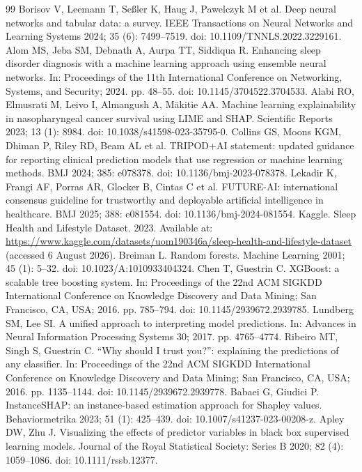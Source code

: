 \documentclass[a4paper,fleqn]{cas-dc}
\begin{document}
\begin{thebibliography}{99}
 Borisov V, Leemann T, Se{\ss}ler K, Haug J, Pawelczyk M et al. Deep neural networks and tabular data: a survey. IEEE Transactions on Neural Networks and Learning Systems 2024; 35 (6): 7499--7519. doi: 10.1109/\allowbreak TNNLS.2022.3229161.
 Alom MS, Jeba SM, Debnath A, Aurpa TT, Siddiqua R. Enhancing sleep disorder diagnosis with a machine learning approach using ensemble neural networks. In: Proceedings of the 11th International Conference on Networking, Systems, and Security; 2024. pp. 48--55. doi: 10.1145/3704522.3704533.
 Alabi RO, Elmusrati M, Leivo I, Almangush A, M{\"a}kitie AA. Machine learning explainability in nasopharyngeal cancer survival using LIME and SHAP. Scientific Reports 2023; 13 (1): 8984. doi: 10.1038/s41598-023-35795-0.
 Collins GS, Moons KGM, Dhiman P, Riley RD, Beam AL et al. TRIPOD+AI statement: updated guidance for reporting clinical prediction models that use regression or machine learning methods. BMJ 2024; 385: e078378. doi: 10.1136/bmj-2023-078378.
 Lekadir K, Frangi AF, Porras AR, Glocker B, Cintas C et al. FUTURE-AI: international consensus guideline for trustworthy and deployable artificial intelligence in healthcare. BMJ 2025; 388: e081554. doi: 10.1136/bmj-2024-081554.
 Kaggle. Sleep Health and Lifestyle Dataset. 2023. Available at: \url{https://www.kaggle.com/datasets/uom190346a/sleep-health-and-lifestyle-dataset} (accessed 6 August 2026).
 Breiman L. Random forests. Machine Learning 2001; 45 (1): 5--32. doi: 10.1023/A:1010933404324.
 Chen T, Guestrin C. XGBoost: a scalable tree boosting system. In: Proceedings of the 22nd ACM SIGKDD International Conference on Knowledge Discovery and Data Mining; San Francisco, CA, USA; 2016. pp. 785--794. doi: 10.1145/2939672.2939785.
 Lundberg SM, Lee SI. A unified approach to interpreting model predictions. In: Advances in Neural Information Processing Systems 30; 2017. pp. 4765--4774.
 Ribeiro MT, Singh S, Guestrin C. ``Why should I trust you?'': explaining the predictions of any classifier. In: Proceedings of the 22nd ACM SIGKDD International Conference on Knowledge Discovery and Data Mining; San Francisco, CA, USA; 2016. pp. 1135--1144. doi: 10.1145/2939672.2939778.
 Babaei G, Giudici P. InstanceSHAP: an instance-based estimation approach for Shapley values. Behaviormetrika 2023; 51 (1): 425--439. doi: 10.1007/s41237-023-00208-z.
 Apley DW, Zhu J. Visualizing the effects of predictor variables in black box supervised learning models. Journal of the Royal Statistical Society: Series B 2020; 82 (4): 1059--1086. doi: 10.1111/rssb.12377.

\end{thebibliography}
\end{document}
